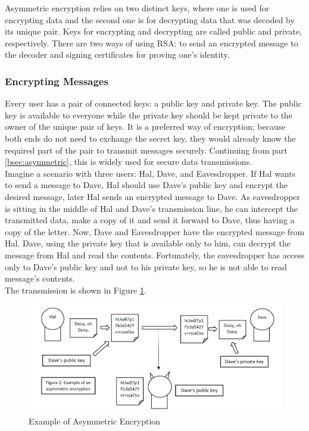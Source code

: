 \documentclass[a4paper, 12pt]{article}
\begin{document}
Asymmetric encryption relies on two distinct keys, where one is
used for encrypting data and the second one is for decrypting data that was decoded by its unique pair.
Keys for encrypting and decrypting are called public and private, respectively. There are two ways
of using RSA: to send an encrypted message to the decoder and signing certificates for
proving one's identity.\\

\subsubsection{Encrypting Messages}
\label{bbsec:encryption}

Every user has a pair of connected keys: a public key and private key. The public key is available
to everyone while the private key should be kept private to the owner of the unique pair
of keys. It is a preferred way of encryption; because both ends do not need to exchange the secret
key, they would already know the required part of the pair to transmit messages securely.
Continuing from part \ref{bsec:asymmetric}, this is widely used for secure data transmissions.\\

Imagine a scenario with three
users: Hal, Dave, and Eavesdropper. If Hal wants to send a message to Dave, Hal should use Dave's
public key and encrypt the desired message, later Hal sends an encrypted message to Dave. As
eavesdropper is sitting in the middle of Hal and Dave's transmission line, he can intercept the
transmitted data, make a copy of it and send it forward to Dave, thus having a copy of the letter.
Now, Dave and Eavesdropper have the encrypted message from Hal. Dave, using the private key
that is available only to him, can decrypt the message from Hal and read the contents. Fortunately,
the eavesdropper has access only to Dave's public key and not to his private key, so he is not able to read
message's contents.\\

The transmission is shown in Figure \ref{fig:asymmetric}.

\begin{figure}[h!]
  \begin{center}
    \includegraphics[width=\textwidth]{asymmetric.png}
    \caption{Example of Asymmetric Encryption}
    \label{fig:asymmetric}
    \end{center}
  \end{figure}
\end{document}
